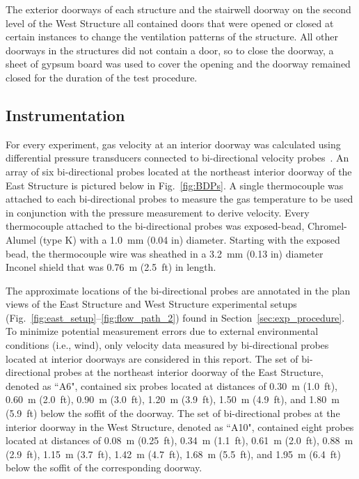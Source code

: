 \documentclass[12pt,oneside]{book}
\begin{document}
The exterior doorways of each structure and the stairwell doorway on the second level of the West Structure all contained doors that were opened or closed at certain instances to change the ventilation patterns of the structure. All other doorways in the structures did not contain a door, so to close the doorway, a sheet of gypsum board was used to cover the opening and the doorway remained closed for the duration of the test procedure.
\FloatBarrier

\subsection{Instrumentation}
\label{sec:instrumentation}
 For every experiment, gas velocity at an interior doorway was calculated using differential pressure transducers connected to bi-directional velocity probes~\cite{McCaffrey:Combustion_and_Flame}. An array of six bi-directional probes located at the northeast interior doorway of the East Structure is pictured below in Fig.~\ref{fig:BDPs}. A single thermocouple was attached to each bi-directional probes to measure the gas temperature to be used in conjunction with the pressure measurement to derive velocity. Every thermocouple attached to the bi-directional probes was exposed-bead, Chromel-Alumel (type K) with a 1.0~mm (0.04 in) diameter. Starting with the exposed bead, the thermocouple wire was sheathed in a 3.2~mm (0.13 in) diameter Inconel shield that was 0.76~m (2.5~ft) in length. 

The approximate locations of the bi-directional probes are annotated in the plan views of the East Structure and West Structure experimental setups (Fig.~\ref{fig:east_setup}--\ref{fig:flow_path_2}) found in Section~\ref{sec:exp_procedure}. To minimize potential measurement errors due to external environmental conditions (i.e., wind), only velocity data measured by bi-directional probes located at interior doorways are considered in this report. The set of bi-directional probes at the northeast interior doorway of the East Structure, denoted as ``A6", contained six probes located at distances of 0.30~m (1.0~ft), 0.60~m (2.0~ft), 0.90~m (3.0~ft), 1.20~m (3.9~ft), 1.50~m (4.9~ft), and 1.80~m (5.9~ft) below the soffit of the doorway. The set of bi-directional probes at the interior doorway in the West Structure, denoted as ``A10", contained eight probes located at distances of 0.08~m (0.25~ft), 0.34~m (1.1~ft), 0.61~m (2.0~ft), 0.88~m (2.9~ft), 1.15~m (3.7~ft), 1.42~m (4.7~ft), 1.68~m (5.5~ft), and 1.95~m (6.4~ft) below the soffit of the corresponding doorway.
\end{document}
